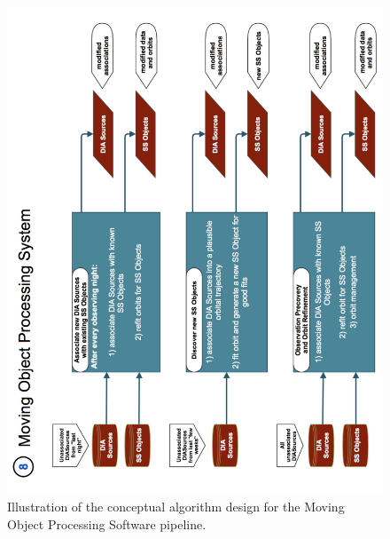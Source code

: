 \documentclass[12pt]{article}
\begin{document}
\begin{figure}[!t]
    \centering
    \vskip -2.3in
    \includegraphics[scale=0.50, angle=270]{gliffy/MOPS-Level0}
    \vskip -0.1in
    \caption{Illustration of the conceptual algorithm design for the Moving Object Processing Software pipeline. \label{fig:Pipe8}}
\end{figure}
\end{document}
